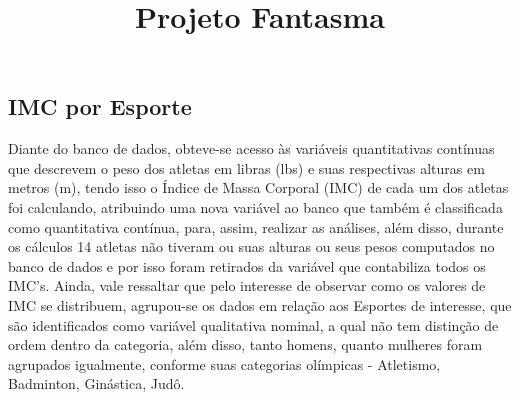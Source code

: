\documentclass[
]{estat/estat}
\title{Projeto Fantasma}
\author{}
\date{}
\renewcommand*\contentsname{Índice}
\newcommand\contentsname{Índice}
\begin{document}
\maketitle

\fancyhf{} 

\fancyhead[L]{} %
\renewcommand{\headrulewidth}{0pt}   %

\fancyfoot[R]{\textcolor{white}{\thepage}} %

\pagestyle{fancy} 

\renewcommand*\contentsname{Sumário}
{
\hypersetup{linkcolor=}
\setcounter{tocdepth}{3}
\tableofcontents
}

\subsection{IMC por Esporte}\label{imc-por-esporte}

Diante do banco de dados, obteve-se acesso às variáveis quantitativas
contínuas que descrevem o peso dos atletas em libras (lbs) e suas
respectivas alturas em metros (m), tendo isso o Índice de Massa Corporal
(IMC) de cada um dos atletas foi calculando, atribuindo uma nova
variável ao banco que também é classificada como quantitativa contínua,
para, assim, realizar as análises, além disso, durante os cálculos 14
atletas não tiveram ou suas alturas ou seus pesos computados no banco de
dados e por isso foram retirados da variável que contabiliza todos os
IMC's. Ainda, vale ressaltar que pelo interesse de observar como os
valores de IMC se distribuem, agrupou-se os dados em relação aos
Esportes de interesse, que são identificados como variável qualitativa
nominal, a qual não tem distinção de ordem dentro da categoria, além
disso, tanto homens, quanto mulheres foram agrupados igualmente,
conforme suas categorias olímpicas - Atletismo, Badminton, Ginástica,
Judô.
\end{document}
